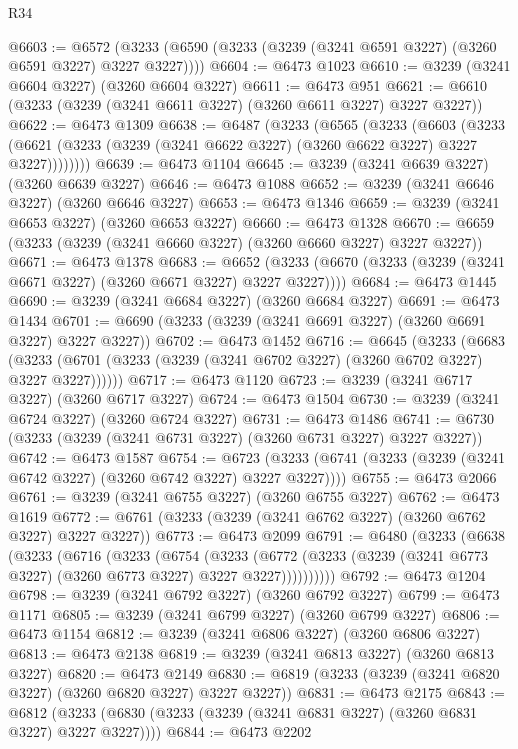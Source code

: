 \begin{lexlean}{R34}
\begin{coremodule}
@6603 := @6572 (@3233 (@6590 (@3233 (@3239 (@3241 @6591 @3227) (@3260 @6591 @3227) @3227 @3227))))
@6604 := @6473 @1023
@6610 := @3239 (@3241 @6604 @3227) (@3260 @6604 @3227)
@6611 := @6473 @951
@6621 := @6610 (@3233 (@3239 (@3241 @6611 @3227) (@3260 @6611 @3227) @3227 @3227))
@6622 := @6473 @1309
@6638 := @6487
    (@3233
      (@6565
        (@3233
          (@6603
            (@3233 (@6621 (@3233 (@3239 (@3241 @6622 @3227) (@3260 @6622 @3227) @3227 @3227))))))))
@6639 := @6473 @1104
@6645 := @3239 (@3241 @6639 @3227) (@3260 @6639 @3227)
@6646 := @6473 @1088
@6652 := @3239 (@3241 @6646 @3227) (@3260 @6646 @3227)
@6653 := @6473 @1346
@6659 := @3239 (@3241 @6653 @3227) (@3260 @6653 @3227)
@6660 := @6473 @1328
@6670 := @6659 (@3233 (@3239 (@3241 @6660 @3227) (@3260 @6660 @3227) @3227 @3227))
@6671 := @6473 @1378
@6683 := @6652 (@3233 (@6670 (@3233 (@3239 (@3241 @6671 @3227) (@3260 @6671 @3227) @3227 @3227))))
@6684 := @6473 @1445
@6690 := @3239 (@3241 @6684 @3227) (@3260 @6684 @3227)
@6691 := @6473 @1434
@6701 := @6690 (@3233 (@3239 (@3241 @6691 @3227) (@3260 @6691 @3227) @3227 @3227))
@6702 := @6473 @1452
@6716 := @6645
    (@3233
      (@6683 (@3233 (@6701 (@3233 (@3239 (@3241 @6702 @3227) (@3260 @6702 @3227) @3227 @3227))))))
@6717 := @6473 @1120
@6723 := @3239 (@3241 @6717 @3227) (@3260 @6717 @3227)
@6724 := @6473 @1504
@6730 := @3239 (@3241 @6724 @3227) (@3260 @6724 @3227)
@6731 := @6473 @1486
@6741 := @6730 (@3233 (@3239 (@3241 @6731 @3227) (@3260 @6731 @3227) @3227 @3227))
@6742 := @6473 @1587
@6754 := @6723 (@3233 (@6741 (@3233 (@3239 (@3241 @6742 @3227) (@3260 @6742 @3227) @3227 @3227))))
@6755 := @6473 @2066
@6761 := @3239 (@3241 @6755 @3227) (@3260 @6755 @3227)
@6762 := @6473 @1619
@6772 := @6761 (@3233 (@3239 (@3241 @6762 @3227) (@3260 @6762 @3227) @3227 @3227))
@6773 := @6473 @2099
@6791 := @6480
    (@3233
      (@6638
        (@3233
          (@6716
            (@3233
              (@6754
                (@3233
                  (@6772 (@3233 (@3239 (@3241 @6773 @3227) (@3260 @6773 @3227) @3227 @3227))))))))))
@6792 := @6473 @1204
@6798 := @3239 (@3241 @6792 @3227) (@3260 @6792 @3227)
@6799 := @6473 @1171
@6805 := @3239 (@3241 @6799 @3227) (@3260 @6799 @3227)
@6806 := @6473 @1154
@6812 := @3239 (@3241 @6806 @3227) (@3260 @6806 @3227)
@6813 := @6473 @2138
@6819 := @3239 (@3241 @6813 @3227) (@3260 @6813 @3227)
@6820 := @6473 @2149
@6830 := @6819 (@3233 (@3239 (@3241 @6820 @3227) (@3260 @6820 @3227) @3227 @3227))
@6831 := @6473 @2175
@6843 := @6812 (@3233 (@6830 (@3233 (@3239 (@3241 @6831 @3227) (@3260 @6831 @3227) @3227 @3227))))
@6844 := @6473 @2202

\end{coremodule}
\end{lexlean}
